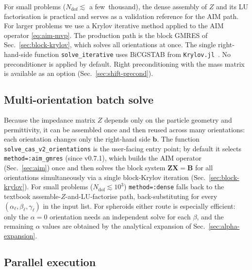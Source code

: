 \documentclass[11pt,a4paper]{article}
\begin{document}
For small problems ($N_{\text{dof}} \lesssim$ a few~thousand), the
dense assembly of $Z$ and its LU factorisation is practical and serves
as a validation reference for the AIM path. For larger problems we use
a Krylov iterative method applied to the AIM operator
\eqref{eq:aim-mvp}. The production path is the block GMRES of
Sec.~\ref{sec:block-krylov}, which solves all orientations at once.
The single right-hand-side function \texttt{solve\_iterative} uses
BiCGSTAB from \texttt{Krylov.jl}~\cite{KrylovJl}. No preconditioner is
applied by default. Right preconditioning with the mass matrix is
available as an option (Sec.~\ref{sec:shift-precond}).

\subsection{Multi-orientation batch solve}
\label{sec:multi-orient}

Because the impedance matrix $Z$ depends only on the particle geometry
and permittivity, it can be assembled once and then reused across many
orientations: each orientation changes only the right-hand side
$\bm{b}$. The function \texttt{solve\_cas\_v2\_orientations} is the
user-facing entry point; by default it selects
\texttt{method=:aim\_gmres} (since v0.7.1), which builds the AIM operator
(Sec.~\ref{sec:aim}) once and then solves the block system
$\mathbf{Z}\mathbf{X}=\mathbf{B}$ for all orientations simultaneously
via a single block-Krylov iteration
(Sec.~\ref{sec:block-krylov}). For small problems
($N_{\text{dof}}\lesssim 10^3$) \texttt{method=:dense} falls back to
the textbook assemble-$Z$-and-LU-factorise path, back-substituting for
every $(\alpha_\ell,\beta_\ell,\gamma_\ell)$ in the input list. For
spheroids either route is especially efficient: only the $\alpha = 0$
orientation needs an independent solve for each $\beta$, and the
remaining $\alpha$ values are obtained by the analytical expansion of
Sec.~\ref{sec:alpha-expansion}.

\subsection{Parallel execution}
\label{sec:parallel}
\end{document}
